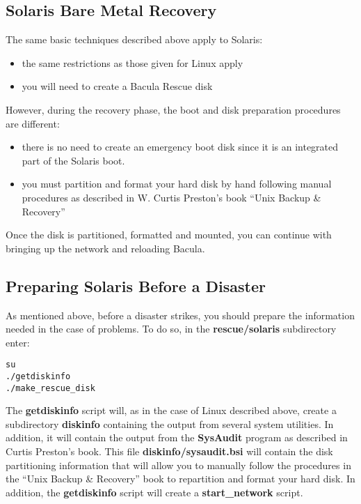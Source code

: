 \label{solaris}

\subsection*{Solaris Bare Metal Recovery}

The same basic techniques described above apply to Solaris: 

\begin{itemize}
\item the same restrictions as those given for Linux apply  
\item you will need to create a Bacula Rescue disk 
   \end{itemize}

However, during the recovery phase, the boot and disk preparation procedures
are different: 

\begin{itemize}
\item there is no need to create an emergency boot disk  since it is an
   integrated part of the Solaris boot.  
\item you must partition and format your hard disk by hand  following manual
   procedures as described in W. Curtis Preston's  book ``Unix Backup \&
   Recovery'' 
\end{itemize}

Once the disk is partitioned, formatted and mounted, you can continue with
bringing up the network and reloading Bacula. 

\subsection*{Preparing Solaris Before a Disaster}

As mentioned above, before a disaster strikes, you should prepare the
information needed in the case of problems. To do so, in the {\bf
rescue/solaris} subdirectory enter: 

\footnotesize
\begin{verbatim}
su
./getdiskinfo
./make_rescue_disk
\end{verbatim}
\normalsize

The {\bf getdiskinfo} script will, as in the case of Linux described above,
create a subdirectory {\bf diskinfo} containing the output from several system
utilities. In addition, it will contain the output from the {\bf SysAudit}
program as described in Curtis Preston's book. This file {\bf
diskinfo/sysaudit.bsi} will contain the disk partitioning information that
will allow you to manually follow the procedures in the ``Unix Backup \&
Recovery'' book to repartition and format your hard disk. In addition, the
{\bf getdiskinfo} script will create a {\bf start\_network} script. 

